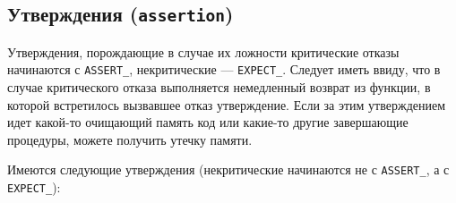\documentclass[12pt, twoside]{report}
\begin{document}
\subsection*{Утверждения (\texttt{assertion})}

Утверждения, порождающие в случае их ложности критические отказы начинаются с \texttt{ASSERT\_}, некритические — \texttt{EXPECT\_}. Следует иметь ввиду, что в случае 
критического отказа выполняется немедленный возврат из функции, в которой встретилось вызвавшее отказ утверждение. Если за этим утверждением идет какой-то 
очищающий память код или какие-то другие завершающие процедуры, можете получить утечку памяти.

Имеются следующие утверждения (некритические начинаются не с \texttt{ASSERT\_}, а с \texttt{EXPECT\_}):
\end{document}
